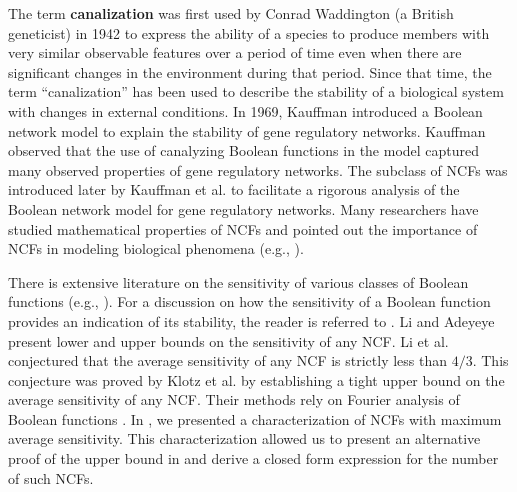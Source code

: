 The term \textbf{canalization} was first used by
Conrad Waddington (a British geneticist)
in 1942 \cite{Waddington-1942}
to express the ability of a species
to produce members with very similar observable features over a period
of time even when there are significant changes in the environment
during that period.
Since that time, the term ``canalization'' has been used to describe
the stability of a biological system with changes
in external conditions.
In 1969, Kauffman \cite{Kauffman-1969} introduced a Boolean network model
to explain the stability of gene regulatory networks.
Kauffman observed that the use of canalyzing Boolean
functions in the model captured many observed properties of
gene regulatory networks.
The subclass of NCFs was
introduced later by Kauffman et al. \cite{Kauffman-etal-2003} 
to facilitate a rigorous analysis of the Boolean network model
for gene regulatory networks.
Many researchers have studied mathematical properties of NCFs and
pointed out the importance of NCFs in modeling biological
phenomena (e.g., \cite{Layne-2011,
Layne-etal-2012,Li-etal-2011,Li-etal-2012,Li-etal-2013}).

There is extensive literature on the sensitivity of various classes
of Boolean functions
(e.g., \cite{Buhrman-etal-2002,Nisan-etal-1994,Zhang-2011}).
For a discussion on how the sensitivity of a Boolean function provides
an indication of its stability, the reader is referred to \cite{Kauffman-etal-2004,
Layne-2011,Layne-etal-2012}.
Li and Adeyeye \cite{Li-etal-2012} present lower and upper bounds on the
sensitivity of any NCF.
Li et al. \cite{Li-etal-2011,Li-etal-2013} conjectured that the average
sensitivity of any NCF is strictly less than  $4/3$.
This conjecture was proved by Klotz et al. \cite{Klotz-etal-2013} by establishing
a tight upper bound on the average sensitivity of any NCF.
Their methods rely on Fourier analysis of Boolean functions
\cite{Odonnell-2014}.
In \cite{Stearns-etal-2018}, 
we presented a characterization of NCFs with maximum average sensitivity.
This characterization allowed us to present an alternative proof 
of the upper bound in \cite{Klotz-etal-2013} and derive a closed
form expression for the number of such NCFs.
